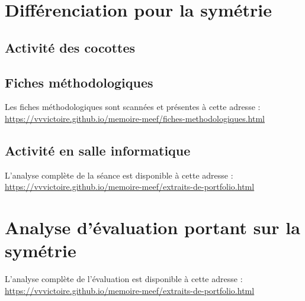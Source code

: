 \section{Différenciation pour la symétrie}

\subsection{Activité des cocottes}\label{annexe:symetrie-act}

\subsection{Fiches méthodologiques}\label{annexe:symetrie-fiches}

Les fiches méthodologiques sont scannées et présentes à cette adresse : \url{https://vvvictoire.github.io/memoire-meef/fiches-methodologiques.html}

\subsection{Activité en salle informatique}\label{annexe:symetrie-tice}

L'analyse complète de la séance est disponible à cette adresse : \url{https://vvvictoire.github.io/memoire-meef/extraits-de-portfolio.html}

\section{Analyse d'évaluation portant sur la symétrie}\label{annexe:symetrie-eval}

L'analyse complète de l'évaluation est disponible à cette adresse : \url{https://vvvictoire.github.io/memoire-meef/extraits-de-portfolio.html}